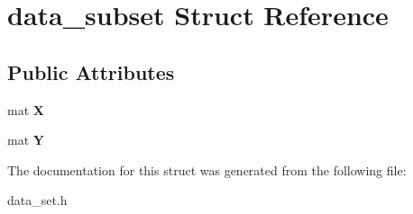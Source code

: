 \hypertarget{structdata__subset}{\section{data\-\_\-subset Struct Reference}
\label{structdata__subset}
}
\subsection*{Public Attributes}
\begin{DoxyCompactItemize}
\item 
\hypertarget{structdata__subset_a4e9c628ca7bc068e9f07e344afb5e2e1}{mat {\bfseries X}}\label{structdata__subset_a4e9c628ca7bc068e9f07e344afb5e2e1}

\item 
\hypertarget{structdata__subset_a5bfef53f9f76bd6a5252be74573c2a48}{mat {\bfseries Y}}\label{structdata__subset_a5bfef53f9f76bd6a5252be74573c2a48}

\end{DoxyCompactItemize}


The documentation for this struct was generated from the following file\-:\begin{DoxyCompactItemize}
\item 
data\-\_\-set.\-h\end{DoxyCompactItemize}
